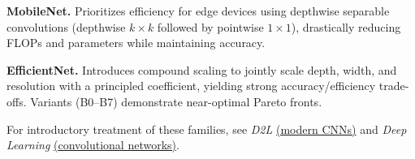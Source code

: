 \textbf{MobileNet.} Prioritizes efficiency for edge devices using depthwise separable convolutions (depthwise $k\times k$ followed by pointwise $1\times1$), drastically reducing FLOPs and parameters while maintaining accuracy.

\textbf{EfficientNet.} Introduces compound scaling to jointly scale depth, width, and resolution with a principled coefficient, yielding strong accuracy/efficiency trade-offs. Variants (B0--B7) demonstrate near-optimal Pareto fronts.

For introductory treatment of these families, see \textit{D2L} \href{https://d2l.ai/chapter_convolutional-modern/index.html}{(modern CNNs)} and \textit{Deep Learning} \href{https://www.deeplearningbook.org/contents/convnets.html}{(convolutional networks)}.

